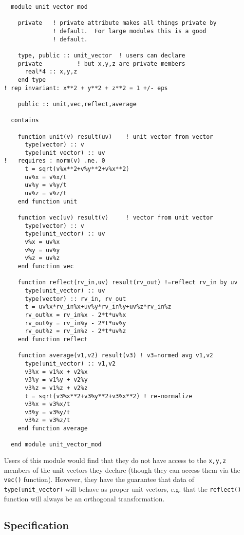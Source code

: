 \begin{verbatim}
  module unit_vector_mod

    private   ! private attribute makes all things private by
              ! default.  For large modules this is a good 
              ! default.

    type, public :: unit_vector  ! users can declare 
    private          ! but x,y,z are private members
      real*4 :: x,y,z
    end type
! rep invariant: x**2 + y**2 + z**2 = 1 +/- eps

    public :: unit,vec,reflect,average

  contains

    function unit(v) result(uv)    ! unit vector from vector
      type(vector) :: v
      type(unit_vector) :: uv
!   requires : norm(v) .ne. 0
      t = sqrt(v%x**2+v%y**2+v%x**2)
      uv%x = v%x/t
      uv%y = v%y/t
      uv%z = v%z/t
    end function unit

    function vec(uv) result(v)     ! vector from unit vector
      type(vector) :: v
      type(unit_vector) :: uv
      v%x = uv%x
      v%y = uv%y
      v%z = uv%z
    end function vec

    function reflect(rv_in,uv) result(rv_out) !=reflect rv_in by uv
      type(unit_vector) :: uv
      type(vector) :: rv_in, rv_out
      t = uv%x*rv_in%x+uv%y*rv_in%y+uv%z*rv_in%z
      rv_out%x = rv_in%x - 2*t*uv%x
      rv_out%y = rv_in%y - 2*t*uv%y
      rv_out%z = rv_in%z - 2*t*uv%z
    end function reflect

    function average(v1,v2) result(v3) ! v3=normed avg v1,v2
      type(unit_vector) :: v1,v2
      v3%x = v1%x + v2%x
      v3%y = v1%y + v2%y
      v3%z = v1%z + v2%z
      t = sqrt(v3%x**2+v3%y**2+v3%x**2) ! re-normalize
      v3%x = v3%x/t
      v3%y = v3%y/t
      v3%z = v3%z/t
    end function average

  end module unit_vector_mod

\end{verbatim}

Users of this module would find that they do not have access to the
\verb+x,y,z+ members of the unit vectors they declare (though they can
access them via the \verb+vec()+ function).  However, they have the
guarantee that data of \verb+type(unit_vector)+ will behave as proper
unit vectors, e.g. that the \verb+reflect()+ function will always be
an orthogonal transformation.

\subsection{Specification}

